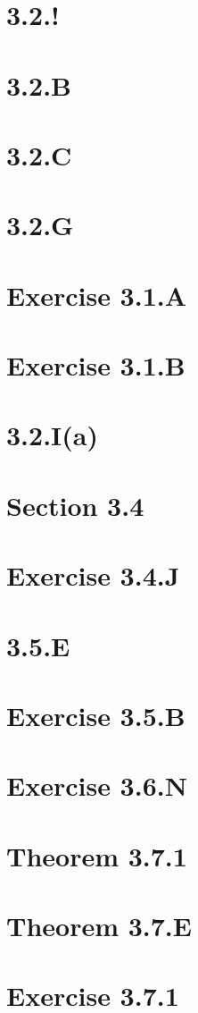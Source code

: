\documentclass{book}
\theoremstyle{definition}
\begin{document}
\section{3.2.!}
\section{3.2.B}
\section{3.2.C}
\section{3.2.G}
\section{Exercise 3.1.A} 
\section{Exercise 3.1.B}
\section{3.2.I(a)} 
\section{Section 3.4} 
\section{Exercise 3.4.J} 
\section{3.5.E} 
\section{Exercise 3.5.B} 
\section{Exercise 3.6.N}
\section{Theorem 3.7.1} 
\section{Theorem 3.7.E} 
\section{Exercise 3.7.1} 
\end{document}

